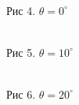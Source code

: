 \documentclass[12pt]{article}
\begin{document}
  \begin{figure}[h!]
    \begin{minipage}[h]{0.32\linewidth}
      \\
      Рис 4. $\theta = 0^{\circ}$
    \end{minipage}
    \begin{minipage}[h]{0.32\linewidth}
      \\
      Рис 5. $\theta = 10^{\circ}$
    \end{minipage}
    \begin{minipage}[h]{0.32\linewidth}
      \\
      Рис 6. $\theta = 20^{\circ}$
    \end{minipage}
  \end{figure}
\end{document}

